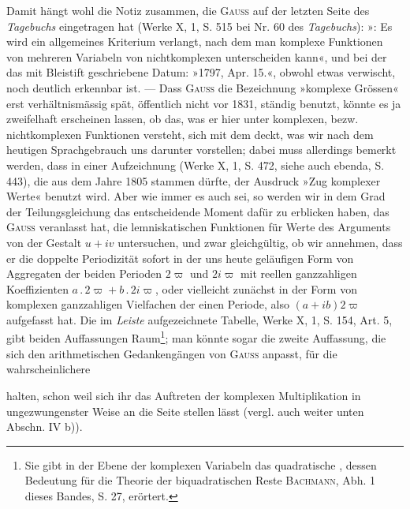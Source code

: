 Damit hängt wohl die Notiz zusammen, die \textsc{Gauss} auf der letzten Seite
des \textit{Tagebuchs} eingetragen hat (Werke X, 1, S. 515 bei Nr. 60 des \textit{Tagebuchs}):
»: Es wird ein allgemeines Kriterium verlangt, nach
dem man komplexe Funktionen von mehreren Variabeln von nichtkomplexen
unterscheiden kann«, und bei der das mit Bleistift geschriebene Datum: »1797,
Apr. 15.«, obwohl etwas verwischt, noch deutlich erkennbar ist. — Dass \textsc{Gauss}
die Bezeichnung »komplexe Grössen« erst verhältnismässig spät, öffentlich nicht
vor 1831, ständig benutzt, könnte es ja zweifelhaft erscheinen lassen, ob das,
was er hier unter komplexen, bezw. nichtkomplexen Funktionen versteht, sich
mit dem deckt, was wir nach dem heutigen Sprachgebrauch uns darunter
vorstellen; dabei muss allerdings bemerkt werden, dass in einer Aufzeichnung
(Werke X, 1, S. 472, siehe auch ebenda, S. 443), die aus dem Jahre 1805
stammen dürfte, der Ausdruck »Zug komplexer Werte« benutzt wird. Aber
wie immer es auch sei, so werden wir in dem Grad der Teilungsgleichung
das entscheidende Moment dafür zu erblicken haben, das \textsc{Gauss} veranlasst
hat, die lemniskatischen Funktionen für Werte des Arguments von der Gestalt
\(u+iv\) untersuchen, und zwar gleichgültig, ob wir annehmen, dass er die doppelte
Periodizität sofort in der uns heute geläufigen Form von Aggregaten
der beiden Perioden \(2\varpi\) und \(2i\varpi\) mit reellen ganzzahligen Koeffizienten
\(a\,.\,2\varpi+b\,.\,2i\varpi\), oder vielleicht zunächst in der Form von komplexen ganzzahligen
Vielfachen der einen Periode, also \((a+ib)2\varpi\) aufgefasst hat. Die
im \textit{Leiste} aufgezeichnete Tabelle, Werke X, 1, S. 154, Art. 5, gibt beiden
Auffassungen Raum\footnote{Sie gibt in der Ebene der komplexen Variabeln das quadratische , dessen Bedeutung
für die Theorie der biquadratischen Reste \textsc{Bachmann}, Abh. 1 dieses Bandes, S. 27, erörtert.}; man könnte sogar die zweite Auffassung, die sich den
arithmetischen Gedankengängen von \textsc{Gauss} anpasst, für die wahrscheinlichere\par
\clearpage{}
\noindent halten, schon weil sich ihr das Auftreten der komplexen Multiplikation in
ungezwungenster Weise an die Seite stellen lässt (vergl. auch weiter unten
Abschn. IV b)).

